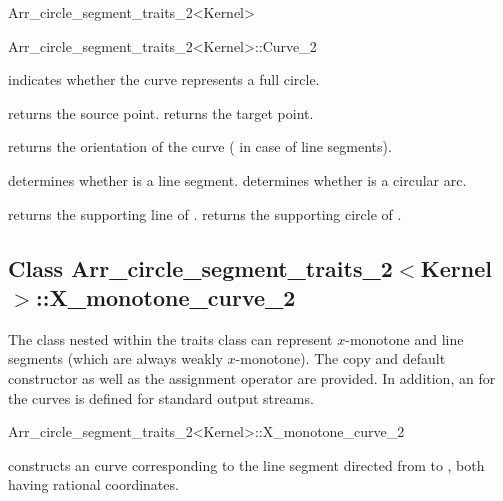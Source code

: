 \begin{ccRefClass}{Arr_circle_segment_traits_2<Kernel>}
\begin{ccClass}{Arr_circle_segment_traits_2<Kernel>::Curve_2}
\ccAccessFunctions

  {indicates whether the curve represents a full circle.}

  {returns the source point.
   }
\ccGlue
{}
  {returns the target point.
   }

  {returns the orientation of the curve ( in case of
   line segments).}

  {determines whether \ccVar{} is a line segment.}
\ccGlue
{}
  {determines whether \ccVar{} is a circular arc.}

  {returns the supporting line of \ccVar{}.
   }
\ccGlue
{}
  {returns the supporting circle of \ccVar{}.
   }

\end{ccClass}

\subsection*{Class 
Arr\_circle\_segment\_traits\_2$<$Kernel$>$::X\_monotone\_curve\_2}

The  class nested within the traits class can
represent $x$-monotone and line segments (which are always weakly $x$-monotone).
The copy and default constructor as well as the assignment operator are
provided. In addition, an  for the curves is defined for
standard output streams.

\begin{ccClass}{Arr_circle_segment_traits_2<Kernel>::X_monotone_curve_2}

\ccCreation
{}

    {constructs an curve corresponding to the line segment directed
     from  to , both having rational coordinates.}


\end{ccClass}
\end{ccRefClass}
